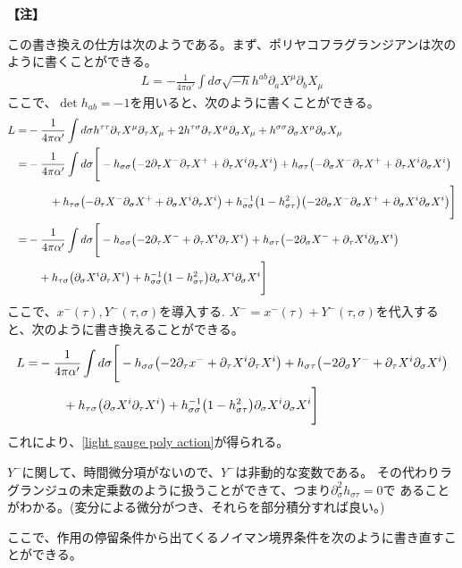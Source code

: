 \documentclass[11pt, dvipdfmx]{article}
\numberwithin{equation}{section}
\newcommand{\blankline}{\par\vspace{\baselineskip}} %
\newenvironment{note}{
    \vspace{1ex} %
    \par\footnotesize\noindent\textbf{【注】}
}{
    \par\vspace{1ex} %
}
\begin{document}
\begin{note}
    この書き換えの仕方は次のようである。まず、ポリヤコフラグランジアンは次のように書くことができる。
    \begin{align}
        L=-\frac{1}{4\pi\alpha'}\int d\sigma \sqrt{-h}h^{ab}\partial_a X^\mu \partial_b X_\mu
    \end{align}
    ここで、$\det h_{ab}=-1$を用いると、次のように書くことができる。
    \begin{align}
        L=&-\frac{1}{4\pi\alpha'}\int d\sigma h^{\tau\tau}\partial_\tau X^\mu \partial_\tau X_\mu + 2h^{\tau\sigma}\partial_\tau X^\mu \partial_\sigma X_\mu + h^{\sigma\sigma}\partial_\sigma X^\mu \partial_\sigma X_\mu\notag\\
        =&-\frac{1}{4\pi\alpha'}\int d\sigma\Bigg[-h_{\sigma\sigma}\qty(-2\partial_\tau X^-\partial_\tau X^+ + \partial_\tau X^i \partial_\tau X^i) + h_{\sigma\tau}\qty(-\partial_\sigma X^- \partial_\tau X^+ + \partial_\tau X^i \partial_\sigma X^i) \notag\\
        & \hspace{2em}+h_{\tau\sigma}\qty(-\partial_\tau X^- \partial_\sigma X^+ + \partial_\sigma X^i \partial_\tau X^i) + h_{\sigma\sigma}^{-1}\qty(1-h_{\sigma\tau}^2)\qty(-2\partial_\sigma X^- \partial_\sigma X^+ + \partial_\sigma X^i \partial_\sigma X^i)\Bigg]\notag\\
        =&-\frac{1}{4\pi\alpha'}\int d\sigma\Bigg[-h_{\sigma\sigma}\qty(-2\partial_\tau X^-+ \partial_\tau X^i \partial_\tau X^i) + h_{\sigma\tau}\qty(-2\partial_\sigma X^-  + \partial_\tau X^i \partial_\sigma X^i) \notag\\
        &\ \ \ +h_{\tau\sigma}\qty( \partial_\sigma X^i \partial_\tau X^i) + h_{\sigma\sigma}^{-1}\qty(1-h_{\sigma\tau}^2) \partial_\sigma X^i \partial_\sigma X^i\Bigg]\notag
    \end{align}
ここで、$x^-(\tau),Y^-(\tau,\sigma)$を導入する.
$X^-=x^-(\tau)+Y^-(\tau,\sigma)$を代入すると、次のように書き換えることができる。
\begin{align}   
    L=&-\frac{1}{4\pi\alpha'}\int d\sigma\Bigg[-h_{\sigma\sigma}\qty(-2\partial_\tau x^-+ \partial_\tau X^i \partial_\tau X^i) + h_{\sigma\tau}\qty(-2\partial_\sigma Y^-  + \partial_\tau X^i \partial_\sigma X^i) \notag\\
    &\hspace{2em} + h_{\tau\sigma}\qty( \partial_\sigma X^i \partial_\tau X^i) + h_{\sigma\sigma}^{-1}\qty(1-h_{\sigma\tau}^2) \partial_\sigma X^i \partial_\sigma X^i\Bigg]\notag
\end{align}
これにより、\eqref{light gauge poly action}が得られる。
\end{note}
$Y^-$に関して、時間微分項がないので、$Y^-$は非動的な変数である。
その代わりラグランジュの未定乗数のように扱うことができて、つまり$\partial_\sigma^2 h_{\sigma\tau}=0$で
あることがわかる。(変分による微分がつき、それらを部分積分すれば良い。)
\blankline
ここで、作用の停留条件から出てくるノイマン境界条件を次のように書き直すことができる。
\end{document}
